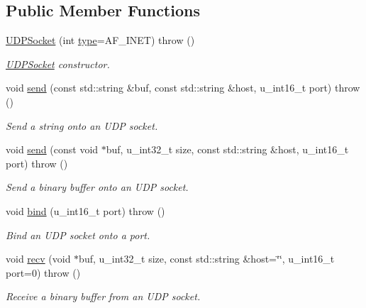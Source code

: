 \subsection*{Public Member Functions}
\begin{CompactItemize}
\item 
\hyperlink{classusock_1_1UDPSocket_f1db79ca3083ee144302c2ad9fc1b017}{UDPSocket} (int \hyperlink{classusock_1_1BaseSocket_8117d25c7b482eb594d68137868ce5f9}{type}=AF\_\-INET)  throw ()
\begin{CompactList}\small\item\em \hyperlink{classusock_1_1UDPSocket}{UDPSocket} constructor. \item\end{CompactList}\item 
void \hyperlink{classusock_1_1UDPSocket_5669548bd12ad139cc7b901cb4701e5c}{send} (const std::string \&buf, const std::string \&host, u\_\-int16\_\-t port)  throw ()
\begin{CompactList}\small\item\em Send a string onto an UDP socket. \item\end{CompactList}\item 
void \hyperlink{classusock_1_1UDPSocket_49d2828223835e216fdee794519b00e7}{send} (const void $\ast$buf, u\_\-int32\_\-t size, const std::string \&host, u\_\-int16\_\-t port)  throw ()
\begin{CompactList}\small\item\em Send a binary buffer onto an UDP socket. \item\end{CompactList}\item 
void \hyperlink{classusock_1_1UDPSocket_daab178fe0b22f862e8d25d268080f05}{bind} (u\_\-int16\_\-t port)  throw ()
\begin{CompactList}\small\item\em Bind an UDP socket onto a port. \item\end{CompactList}\item 
void \hyperlink{classusock_1_1UDPSocket_a3ffe1666074dc785e0c70e0d36c9bf4}{recv} (void $\ast$buf, u\_\-int32\_\-t size, const std::string \&host=\char`\"{}\char`\"{}, u\_\-int16\_\-t port=0)  throw ()
\begin{CompactList}\small\item\em Receive a binary buffer from an UDP socket. \item\end{CompactList}\item 

\end{CompactItemize}
